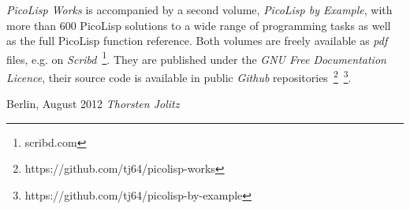 \emph{PicoLisp Works} is accompanied by a second volume,
\emph{PicoLisp by Example}, with more than 600 PicoLisp solutions to a
wide range of programming tasks as well as the full PicoLisp function
reference. Both volumes are freely available as \emph{pdf} files, e.g.
on \emph{Scribd}~\footnote{scribd.com}. They are published under the
\emph{GNU Free Documentation Licence}, their source code is available
in public \emph{Github}
repositories~\footnote{https://github.com/tj64/picolisp-works}~\footnote{https://github.com/tj64/picolisp-by-example}.



\vspace{1cm}
\begin{flushright}\noindent
Berlin, August 2012 \hfill {\it Thorsten Jolitz}\\
\end{flushright}

\vfill




